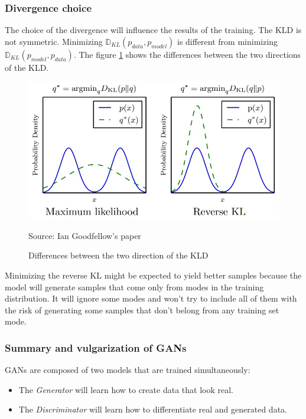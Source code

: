 \documentclass[12pt]{report}
\begin{document}
\subsubsection{Divergence choice}

The choice of the divergence will influence the results of the training.
The KLD is not symmetric.
Minimizing $\mathbb{D}_{KL}(p_{data}, p_{model})$ is different from minimizing $\mathbb{D}_{KL}(p_{model}, p_{data})$.
The figure \ref{fig:gan:directions-kld} shows the differences between the two directions of the KLD.
\begin{figure}[htbp]
    \centering
    \includegraphics[width=\textwidth]{images/nn/graphs/reverse-kl.jpg}
    \caption{Differences between the two direction of the KLD}
    Source: Ian Goodfellow's paper \cite{goodfellow_nips_2017}
    \label{fig:gan:directions-kld}
\end{figure}
Minimizing the reverse KL might be expected to yield better samples because the model will generate samples that come only from modes in the training distribution.
It will ignore some modes and won't try to include all of them with the risk of generating some samples that don't belong from any training set mode.

\subsubsection{Summary and vulgarization of GANs}

GANs are composed of two models that are trained simultaneously:
\begin{itemize}
    \item The \textit{Generator} will learn how to create data that look real.
    \item The \textit{Discriminator} will learn how to differentiate real and generated data.
\end{itemize}
\end{document}
